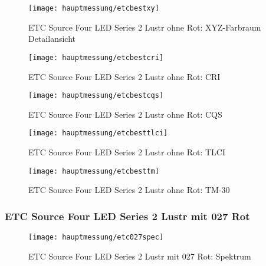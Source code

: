 \documentclass[pagesize,paper=A4,fontsize=12pt,utf8,numbers=noenddot,bibliography=totoc,listof=totoc,DIV=11,BCOR=1mm]{scrreprt}
\begin{document}
\begin{figure}[htp]     %
\centering
\texttt{[image: hauptmessung/etcbestxy]} 
\caption {ETC Source Four LED Series 2 Lustr ohne Rot: XYZ-Farbraum Detailansicht} 
\end{figure}

\begin{figure}[htp]     %
\centering
\texttt{[image: hauptmessung/etcbestcri]} 
\caption {ETC Source Four LED Series 2 Lustr ohne Rot: CRI} 
\end{figure}

\begin{figure}[htp]     %
\centering
\texttt{[image: hauptmessung/etcbestcqs]} 
\caption {ETC Source Four LED Series 2 Lustr ohne Rot: CQS} 
\end{figure}

\begin{figure}[htp]     %
\centering
\texttt{[image: hauptmessung/etcbesttlci]} 
\caption {ETC Source Four LED Series 2 Lustr ohne Rot: TLCI} 
\end{figure}

\begin{figure}[htp]     %
\centering
\texttt{[image: hauptmessung/etcbesttm]} 
\caption {ETC Source Four LED Series 2 Lustr ohne Rot: TM-30} 
\end{figure}

\subsubsection{ETC Source Four LED Series 2 Lustr mit 027 Rot}

\begin{figure}[htp]     %
\centering
\texttt{[image: hauptmessung/etc027spec]} 
\caption {ETC Source Four LED Series 2 Lustr mit 027 Rot: Spektrum} 
\end{figure}
\end{document}
